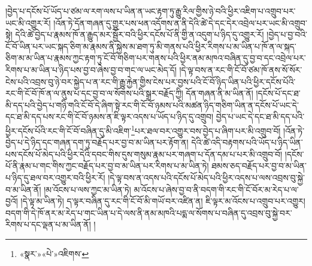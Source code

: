 །བྱེད་པ་དངོས་པོ་ཡོད་པ་ཙམ་ལ་རག་ལས་པ་ཡིན་ན་ཡང་རྟག་ཏུ་རྒྱུ་རིལ་གྱིས་ཉེ་བའི་ཕྱིར་འཇིག་པ་འགྲུབ་པར་ཡང་མི་འགྱུར་རོ། །འོན་ཏེ་དོན་གཞན་དུ་གྱུར་པས་ཕན་འདོགས་ན་ནི་དེའི་ཚེ་དེ་དང་དེར་འབྲེལ་པར་ཡང་མི་འགྲུབ་སྟེ། དེའི་ཚེ་བྱེད་པ་རྣམས་ཁོ་ན་རྒྱུད་མར་སྦྱོར་བའི་ཕྱིར་དངོས་པོ་ནི་གྱི་ན་འདུག་པ་ཉིད་དུ་འགྱུར་རོ། །བྱེད་པ་བྱ་བའི་ངོ་བོ་ཡིན་པར་ཡང་སྐད་ཅིག་མ་རྣམས་ནི་སྐྱེས་མ་ཐག་ཏུ་མི་གནས་པའི་ཕྱིར་རིགས་པ་མ་ཡིན་པ་ཁོ་ན་ལ་སྐད་ཅིག་མ་མ་ཡིན་པ་རྣམས་ཀྱང་རྟག་ཏུ་ངོ་བོ་གཅིག་པར་གནས་པའི་ཕྱིར་ནམ་མཁའ་བཞིན་དུ་བྱ་བ་དང་འབྲེལ་པར་རིགས་པ་མ་ཡིན་པ་ཉིད་པས་བྱ་བ་ཞེས་བྱ་བ་གང་ལ་ཡང་མེད་དོ། །དེ་ལྟ་བས་ན་རང་གི་ངོ་བོ་ཙམ་ཁོ་ནས་སོ་སོར་ངེས་པའི་འབྲས་བུ་ཉེ་བར་སྐྱེད་པ་ན་རང་གི་རྒྱུ་རྐྱེན་གྱིས་ངེས་པར་བྱས་པའི་ངོ་བོ་ཉིད་ཡིན་པའི་ཕྱིར་དངོས་པོའི་རང་གི་ངོ་བོ་ཁོ་ན་ལ་ནུས་པ་དང་བྱ་བ་ལ་སོགས་པའི་སྒྲར་བརྗོད་ཀྱི། དོན་གཞན་ནི་མ་ཡིན་ནོ། །དངོས་པོ་དང་ཐ་མི་དད་པའི་བྱེད་པ་གཉི་གའི་ངོ་བོ་དེ་ཞིག་སྟེ་རང་གི་ངོ་བོ་ཉམས་པའི་མཚན་ཉིད་གཅིག་ཡིན་ན་དངོས་པོ་ཡང་དེ་དང་ཐ་མི་དད་པས་རང་གི་ངོ་བོ་ཉམས་ན་ཇི་ལྟར་འདས་པ་ཡོད་པ་ཉིད་དུ་འགྲུབ། བྱེད་པ་ཡང་དེ་དང་ཐ་མི་དད་པའི་ཕྱིར་དངོས་པོའི་རང་གི་ངོ་བོ་བཞིན་དུ་མི་འཇིག་\footnote{«སྣར་»«པེ་»འཇིགས་}པར་ཐལ་བར་འགྱུར་བས་བྱེད་པ་ཞིག་པར་མི་འགྲུབ་བོ། །འོན་ཏེ་བྱེད་པ་དེ་ཉིད་དང་གཞན་དག་ཏུ་བརྗོད་པར་བྱ་བ་མ་ཡིན་པར་རྟོག་ན། དེའི་ཚེ་འདི་བརྟགས་པའི་ཡོད་པ་ཉིད་ཡིན་པས་དངོས་པོ་མེད་པའི་ཕྱིར་དེའི་དབང་གིས་དུས་གསུམ་རྣམ་པར་གཞག་པ་དོན་དམ་པ་པར་མི་འགྲུབ་བོ། །དངོས་པོ་ནི་རྣམ་པ་གང་གིས་ཀྱང་བརྗོད་པར་བྱ་བ་མ་ཡིན་པར་རིགས་པ་མ་ཡིན་ཏེ། ཐམས་ཅད་བརྗོད་པར་བྱ་བ་མ་ཡིན་པ་ཉིད་དུ་ཐལ་བར་འགྱུར་བའི་ཕྱིར་རོ། །དེ་ལྟ་བས་ན་འདས་པའི་དངོས་པོ་མེད་པའི་ཕྱིར་འདས་པ་ལས་འབྲས་བུ་སྐྱེ་བ་མ་ཡིན་ནོ། །མ་འོངས་པ་ལས་ཀྱང་མ་ཡིན་ཏེ། མ་འོངས་པ་ཞེས་བྱ་བ་ནི་བདག་གི་རང་གི་ངོ་བོར་མ་རེད་པ་ལ་བྱའོ། །དེ་ལྟ་མ་ཡིན་ཏེ། ད་ལྟར་བཞིན་དུ་རང་གི་ངོ་བོ་མི་གཡོ་བར་འཛིན་ན། ཇི་ལྟར་མ་འོངས་པ་འགྲུབ་པར་འགྱུར། བདག་གི་དེ་ཁོ་ནར་མ་རེད་པ་གང་ཡིན་པ་དེ་ལས་ནི་ནམ་མཁའི་པདྨ་ལ་སོགས་པ་བཞིན་དུ་འབྲས་བུ་སྐྱེ་བར་རིགས་པ་དང་ལྡན་པ་མ་ཡིན་ནོ། །
